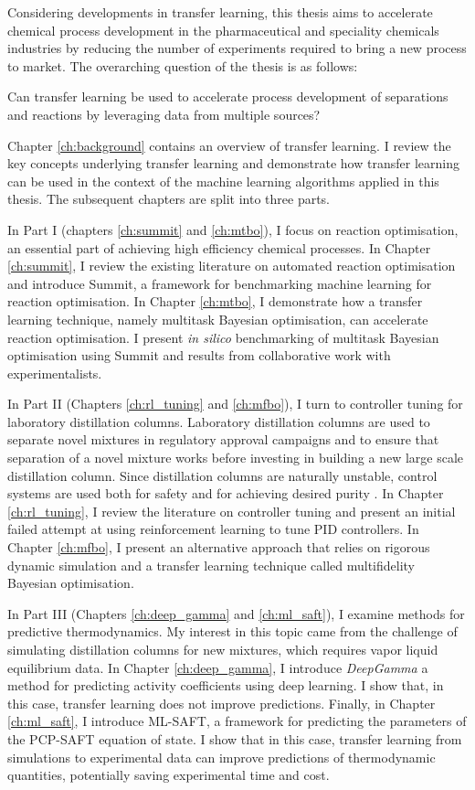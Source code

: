 Considering developments in transfer learning, this thesis aims to accelerate chemical process development in the pharmaceutical and speciality chemicals industries by reducing the number of experiments required to bring a new process to market. The overarching question of the thesis is as follows:
\begin{displayquote}
Can transfer learning be used to accelerate process development of separations and reactions by leveraging data from multiple sources? 
\end{displayquote}
Chapter \ref{ch:background} contains an overview of transfer learning. I review the key concepts underlying transfer learning and demonstrate how transfer learning can be used in the context of the machine learning algorithms applied in this thesis.  The subsequent chapters are split into three parts.

In Part I (chapters \ref{ch:summit} and \ref{ch:mtbo}), I focus on reaction optimisation, an essential part of achieving high efficiency chemical processes. In Chapter \ref{ch:summit}, I review the existing literature on automated reaction optimisation and introduce Summit, a framework for benchmarking machine learning for reaction optimisation.  In Chapter \ref{ch:mtbo}, I demonstrate how a transfer learning technique, namely multitask Bayesian optimisation, can accelerate reaction optimisation. I present \textit{in silico} benchmarking of multitask Bayesian optimisation using Summit and results from collaborative work with experimentalists.

In Part II (Chapters \ref{ch:rl_tuning} and \ref{ch:mfbo}), I turn to controller tuning for laboratory distillation columns. Laboratory distillation columns are used to separate novel mixtures in regulatory approval campaigns and to ensure that separation of a novel mixture works before investing in building a new large scale distillation column. Since distillation columns are naturally unstable, control systems are used both for safety and for achieving desired purity \cite{Skogestad2007}. In Chapter \ref{ch:rl_tuning}, I review the literature on controller tuning and present an initial failed attempt at using reinforcement learning to tune PID controllers. In Chapter \ref{ch:mfbo}, I present an alternative approach that relies on rigorous dynamic simulation and a transfer learning technique called multifidelity Bayesian optimisation.

In Part III (Chapters \ref{ch:deep_gamma} and \ref{ch:ml_saft}), I examine methods for predictive thermodynamics. My interest in this topic came from the challenge of simulating distillation columns for new mixtures, which requires vapor liquid equilibrium data. In Chapter \ref{ch:deep_gamma}, I introduce \textit{DeepGamma} a method for predicting activity coefficients using deep learning. I show that, in this case, transfer learning does not improve predictions. Finally, in Chapter \ref{ch:ml_saft}, I introduce ML-SAFT, a framework for predicting the parameters of the PCP-SAFT equation of state. I show that in this case, transfer learning from simulations to experimental data can improve predictions of thermodynamic quantities, potentially saving experimental time and cost.





